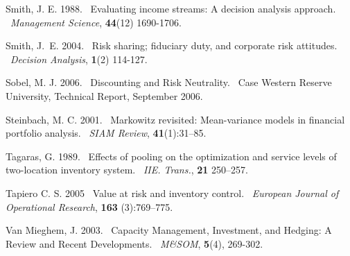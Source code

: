 \documentclass[mnsc,nonblindrev,copyedit]{informs2_wz} %
\def\newblock{\ }%
\newcommand{\OUT}[1]{}
\begin{document}
\begin{thebibliography}{1}
Smith, J. E. 1988.
\newblock Evaluating income streams: A decision analysis approach.
\newblock {\em Management Science}, {\bf 44}(12) 1690-1706.

Smith, J.~E. 2004.
\newblock Risk sharing; fiduciary duty, and corporate risk attitudes.
\newblock {\em Decision Analysis}, {\bf 1}(2) 114-127.

Sobel, M. J. 2006.
\newblock Discounting and Risk Neutrality.
\newblock Case Western Reserve University, Technical Report, September 2006.

Steinbach, M. C. 2001.
\newblock Markowitz revisited: Mean-variance models in financial portfolio
  analysis.
\newblock {\em SIAM Review}, {\bf 41}(1):31--85.

Tagaras, G. 1989.
\newblock Effects of pooling on the optimization and service levels of
  two-location inventory system.
\newblock {\em IIE. Trans.}, {\bf 21} 250--257.

Tapiero C. S. 2005
\newblock Value at risk and inventory control.
\newblock {\em European Journal of Operational Research}, {\bf 163} (3):769--775.


Van Mieghem, J. 2003.
\newblock {Capacity Management, Investment, and Hedging: A Review and Recent Developments.}
\newblock {\em M\&SOM}, {\bf 5}(4), 269-302.

\end{thebibliography}

%
%

\ECSwitch

\ECDisclaimer


\OUT{
\newpage

\setcounter{page}{1}


\section*{On-Line Appendix}
}
\end{document}

